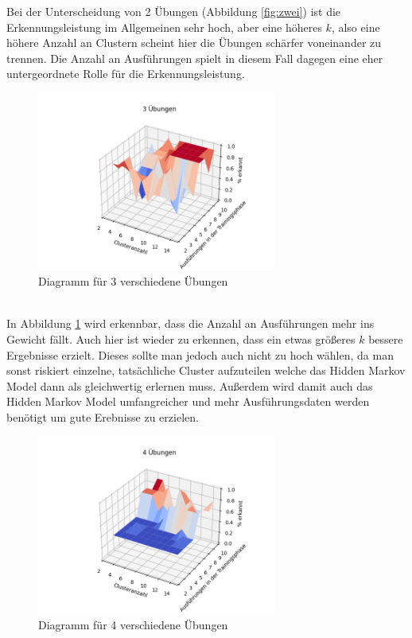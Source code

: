 \documentclass{article}
\begin{document}
Bei der Unterscheidung von 2 Übungen (Abbildung \ref{fig:zwei}) ist die Erkennungsleistung im Allgemeinen sehr hoch, aber eine höheres $k$, also eine höhere Anzahl an Clustern scheint hier die Übungen schärfer voneinander zu trennen.
Die Anzahl an Ausführungen spielt in diesem Fall dagegen eine eher untergeordnete Rolle für die Erkennungsleistung.
\medskip
\begin{figure}[h]
\centering
\includegraphics[width=0.7\textwidth]{figures/3_graph.png}
\caption{Diagramm für 3 verschiedene Übungen}
\label{fig:drei}
\end{figure}\\
In Abbildung \ref{fig:drei} wird erkennbar, dass die Anzahl an Ausführungen mehr ins Gewicht fällt.
Auch hier ist wieder zu erkennen, dass ein etwas größeres $k$ bessere Ergebnisse erzielt.
Dieses sollte man jedoch auch nicht zu hoch wählen, da man sonst riskiert einzelne, tatsächliche Cluster aufzuteilen welche das Hidden Markov Model dann als gleichwertig erlernen muss.
Außerdem wird damit auch das Hidden Markov Model umfangreicher und mehr Ausführungsdaten werden benötigt um gute Erebnisse zu erzielen.\\
\medskip
\begin{figure}[htbp]
\centering
\includegraphics[width=0.7\textwidth]{figures/4_graph.png}
\caption{Diagramm für 4 verschiedene Übungen}
\label{fig:vier}
\end{figure}\\
\end{document}
